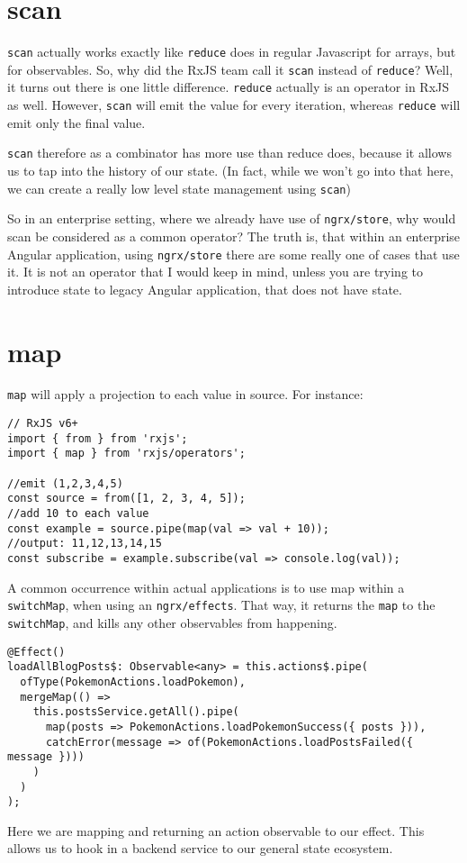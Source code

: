 \section{scan}
\lstinline{scan} actually works exactly like \lstinline{reduce} does in regular Javascript for arrays, but for observables. So, why did the RxJS team call it \lstinline{scan} instead of \lstinline{reduce}? Well, it turns out there is one little difference. \lstinline{reduce} actually is an operator in RxJS as well. However, \lstinline{scan} will emit the value for every iteration, whereas \lstinline{reduce} will emit only the final value. 

\lstinline{scan} therefore as a combinator has more use than reduce does, because it allows us to tap into the history of our state. (In fact, while we won't go into that here, we can create a really low level state management using \lstinline{scan})

So in an enterprise setting, where we already have use of \lstinline{ngrx/store}, why would scan be considered as a common operator? The truth is, that within an enterprise Angular application, using \lstinline{ngrx/store} there are some really one of cases that use it. It is not an operator that I would keep in mind, unless you are trying to introduce state to legacy Angular application, that does not have state. 

\section{map} 
\lstinline{map} will apply a projection to each value in source. For instance: 
\begin{lstlisting}[caption=rxjs map example]
// RxJS v6+
import { from } from 'rxjs';
import { map } from 'rxjs/operators';

//emit (1,2,3,4,5)
const source = from([1, 2, 3, 4, 5]);
//add 10 to each value
const example = source.pipe(map(val => val + 10));
//output: 11,12,13,14,15
const subscribe = example.subscribe(val => console.log(val));
\end{lstlisting}

A common occurrence within actual applications is to use map within a \lstinline{switchMap}, when using an \lstinline{ngrx/effects}. That way, it returns the \lstinline{map} to the \lstinline{switchMap}, and kills any other observables from happening.

\begin{lstlisting}[caption=map example]
@Effect()
loadAllBlogPosts$: Observable<any> = this.actions$.pipe(
  ofType(PokemonActions.loadPokemon),
  mergeMap(() =>
    this.postsService.getAll().pipe(
      map(posts => PokemonActions.loadPokemonSuccess({ posts })),
      catchError(message => of(PokemonActions.loadPostsFailed({ message })))
    )
  )
);  
\end{lstlisting}

Here we are mapping and returning an action observable to our effect. This allows us to hook in a backend service to our general state ecosystem.